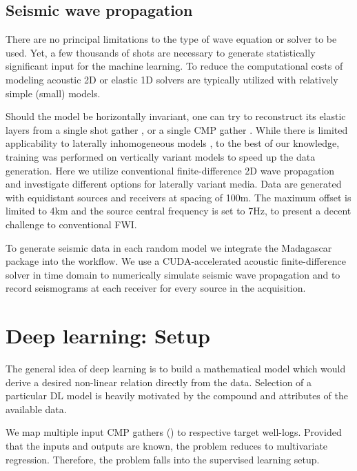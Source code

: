 \documentclass[paper,twocolomn]{geophysics}
\begin{document}
\subsection{Seismic wave propagation}
There are no principal limitations to the type of wave equation or solver to be used. Yet, a few thousands of shots are necessary to generate statistically significant input for the machine learning. To reduce the computational costs of modeling acoustic 2D \citep{polo2018,ovcharenko2018,ovcharenko2019deep, li2019} or elastic 1D \citep[e.g.][]{zheng2019} solvers are typically utilized with relatively simple (small) models.

Should the model be horizontally invariant, one can try to reconstruct its elastic layers from a single shot gather \citep{roth1994}, or a single CMP gather \citep{zheng2019}.
While there is limited applicability to laterally inhomogeneous models \citep{zheng2019}, to the best of our knowledge, training was performed on vertically variant models to speed up the data generation. Here we utilize conventional finite-difference 2D wave propagation and investigate different options for laterally variant media.
Data are generated with equidistant sources and receivers at spacing of 100m. The maximum offset is limited to 4km and the source central frequency is set to 7Hz, to present a decent challenge to conventional FWI.

To generate seismic data in each random model we integrate the Madagascar package into the workflow. 
We use a CUDA-accelerated acoustic finite-difference solver in time domain to numerically simulate seismic wave propagation and to record seismograms at each receiver for every source in the acquisition.
%






\section{Deep learning: Setup}
The general idea of deep learning is to build a mathematical model which would derive a desired non-linear relation directly from the data. Selection of a particular DL model is heavily motivated by the compound and attributes of the available data. 

We map multiple input CMP gathers () to respective target well-logs. Provided that the inputs and outputs are known, the problem reduces to multivariate regression. Therefore, the problem falls into the supervised learning setup.  
\end{document}
